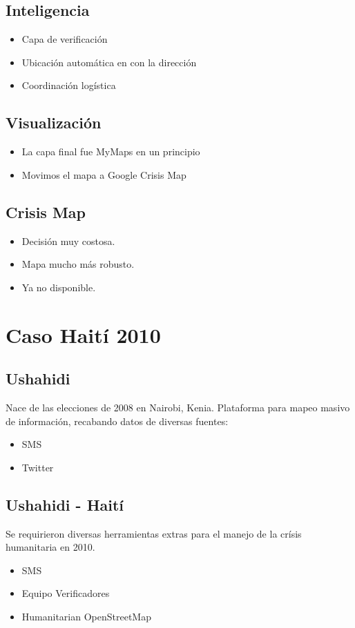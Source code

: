 \documentclass[11pt]{article}
\begin{document}
\subsection{Inteligencia}
\label{sec:org49808ed}
\begin{itemize}
\item Capa de verificación
\item Ubicación automática en con la dirección
\item Coordinación logística
\end{itemize}
\subsection{Visualización}
\label{sec:orgcab734b}
\begin{itemize}
\item La capa final fue MyMaps en un principio
\item Movimos el mapa a Google Crisis Map
\end{itemize}
\subsection{Crisis Map}
\label{sec:org9207960}
\begin{itemize}
\item Decisión muy costosa.
\item Mapa mucho más robusto.
\item Ya no disponible.
\end{itemize}


\section{Caso Haití 2010}
\label{sec:orge8d2530}

\subsection{Ushahidi}
\label{sec:orgcae66d8}
Nace de las elecciones de 2008 en Nairobi, Kenia.
Plataforma para mapeo masivo de información, recabando datos de diversas fuentes:
\begin{itemize}
\item SMS
\item Twitter
\end{itemize}
\subsection{Ushahidi - Haití}
\label{sec:org982e453}
Se requirieron diversas herramientas extras para el manejo de la crísis humanitaria en 2010.
\begin{itemize}
\item SMS
\item Equipo Verificadores
\item Humanitarian OpenStreetMap
\end{itemize}
\end{document}
